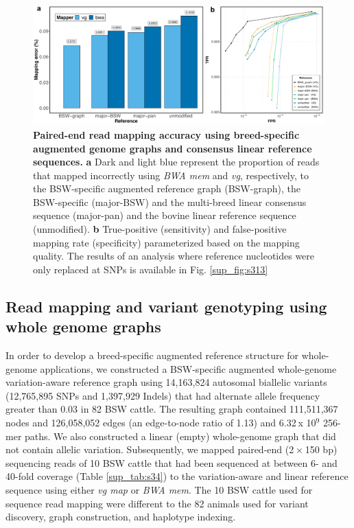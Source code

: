 \documentclass[../main.tex]{subfiles}
\begin{document}
\begin{figure}[!htb]
    \centering
    \includegraphics[width=\textwidth]{paper2/main_figure/Fig5.pdf}
    \caption[Consensus linear mapping]{\textbf{Paired-end read mapping accuracy using breed-specific augmented genome graphs and consensus linear reference sequences.} 
    \small{\textbf{a} Dark and light blue represent the proportion of reads that mapped incorrectly using \emph{BWA mem} and \emph{vg}, respectively, to the BSW-specific augmented reference graph (BSW-graph), the BSW-specific (major-BSW) and the multi-breed linear consensus sequence (major-pan) and the bovine linear reference sequence (unmodified). \textbf{b} True-positive (sensitivity) and false-positive mapping rate (specificity) parameterized based on the mapping quality. The results of an analysis where reference nucleotides were only replaced at SNPs is available in Fig. \ref{sup_fig:s313}}}
    \label{fig35:consen}
\end{figure}

\subsection*{Read mapping and variant genotyping using whole genome graphs}
In order to develop a breed-specific augmented reference structure for whole-genome applications, we constructed a BSW-specific augmented whole-genome variation-aware reference graph using 14,163,824 autosomal biallelic variants (12,765,895 SNPs and 1,397,929 Indels) that had alternate allele frequency greater than 0.03 in 82 BSW cattle. The resulting graph contained 111,511,367 nodes and 126,058,052 edges (an edge-to-node ratio of 1.13) and 6.32 x 10$^9$ 256-mer paths. We also constructed a linear (empty) whole-genome graph that did not contain allelic variation. Subsequently, we mapped paired-end (2 × 150 bp) sequencing reads of 10 BSW cattle that had been sequenced at between 6- and 40-fold coverage (Table \ref{sup_tab:s34}) to the variation-aware and linear reference sequence using either \emph{vg map} or \emph{BWA mem}. The 10 BSW cattle used for sequence read mapping were different to the 82 animals used for variant discovery, graph construction, and haplotype indexing.
\end{document}
